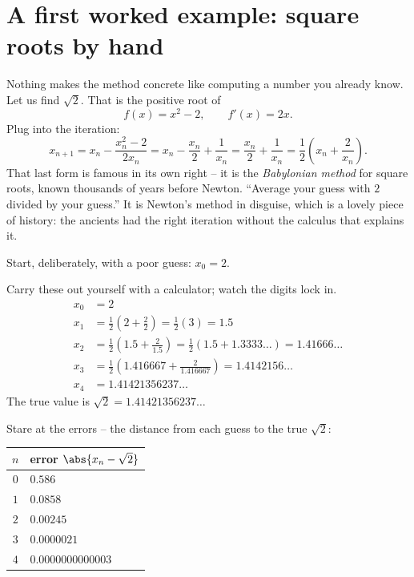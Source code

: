 \section{A first worked example: square roots by hand}
\label{ch19:sqrt-example}

Nothing makes the method concrete like computing a number you already know. Let us
find $\sqrt2$. That is the positive root of
\[
  f(x) = x^2 - 2, \qquad f'(x) = 2x.
\]
Plug into the iteration:
\[
  x_{n+1} = x_n - \frac{x_n^2 - 2}{2 x_n}
          = x_n - \frac{x_n}{2} + \frac{1}{x_n}
          = \frac{x_n}{2} + \frac{1}{x_n}
          = \frac{1}{2}\!\left(x_n + \frac{2}{x_n}\right).
\]
That last form is famous in its own right -- it is the \emph{Babylonian method} for
square roots, known thousands of years before Newton. ``Average your guess with
$2$ divided by your guess.'' It is Newton's method in disguise, which is a lovely
piece of history: the ancients had the right iteration without the calculus that
explains it.

Start, deliberately, with a poor guess: $x_0 = 2$.

\begin{labbox}
Carry these out yourself with a calculator; watch the digits lock in.
\begin{align*}
  x_0 &= 2 \\
  x_1 &= \tfrac12\!\left(2 + \tfrac{2}{2}\right) = \tfrac12(3) = 1.5 \\
  x_2 &= \tfrac12\!\left(1.5 + \tfrac{2}{1.5}\right) = \tfrac12(1.5 + 1.3333\ldots) = 1.41666\ldots \\
  x_3 &= \tfrac12\!\left(1.416667 + \tfrac{2}{1.416667}\right) = 1.4142156\ldots \\
  x_4 &= 1.41421356237\ldots
\end{align*}
The true value is $\sqrt2 = 1.41421356237\ldots$
\end{labbox}

Stare at the errors -- the distance from each guess to the true $\sqrt2$:
\begin{center}
\begin{tabular}{cl}
\toprule
$n$ & error $\abs{x_n - \sqrt2}$ \\
\midrule
$0$ & $0.586$ \\
$1$ & $0.0858$ \\
$2$ & $0.00245$ \\
$3$ & $0.0000021$ \\
$4$ & $0.0000000000003$ \\
\bottomrule
\end{tabular}
\end{center}

